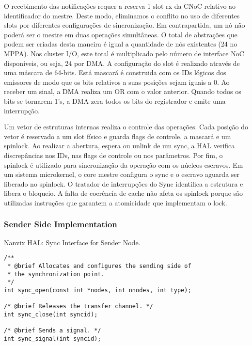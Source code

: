 				O recebimento das notificações requer a reserva 1 slot rx da CNoC relativo ao identificador do mestre.
				Deste modo, eliminamos o conflito no uso de diferentes slots por diferentes configurações de sincronização.
				Em contrapartida, um nó não poderá ser o mestre em duas operações simultâneas.
				O total de abstrações que podem ser criadas desta maneira é igual a quantidade de nós existentes (24 no MPPA).
				Nos cluster I/O, este total é multiplicado pelo número de interface NoC disponíveis, ou seja, 24 por DMA.
				A configuração do slot é realizado através de uma máscara de 64-bits.
				Está mascará é construida com os IDs lógicos dos emissores de modo que os bits relativos a suas posições sejam iguais a 0.
				Ao receber um sinal, a DMA realiza um OR com o valor anterior.
				Quando todos os bits se tornarem 1's, a DMA zera todos os bits do registrador e emite uma interrupção.

				Um vetor de estruturas internas realiza o controle das operações.
				Cada posição do vetor é reservado a um slot físico e guarda flags de controle, a mascará e um spinlock.
				Ao realizar a abertura, espera ou unlink de um sync, a HAL verifica discrepâncias nos IDs, nas flags de controle ou nos parâmetros.
				Por fim, o spinlock é utilizado para sincronização da operação com os núcleos escravos.
				Em um sistema microkernel, o core mestre configura o sync e o escravo aguarda ser liberado no spinlock.
				O tratador de interrupções do Sync identifica a estrutura e libera o bloqueio.
				A falta de coerência de cache não afeta os spinlock porque são utilizadas instruções que garantem a atomicidade que implementam o lock.


			\subsubsection{Sender Side Implementation}

\begin{listing}[!tb]
\caption{Nanvix HAL: Sync Interface for Sender Node.}
\label{code:hal-sync-sender}
\begin{verbatim}
/**
 * @brief Allocates and configures the sending side of
 * the synchronization point.
 */
int sync_open(const int *nodes, int nnodes, int type);

/* @brief Releases the transfer channel. */
int sync_close(int syncid);

/* @brief Sends a signal. */
int sync_signal(int syncid);
\end{verbatim}
\end{listing}

